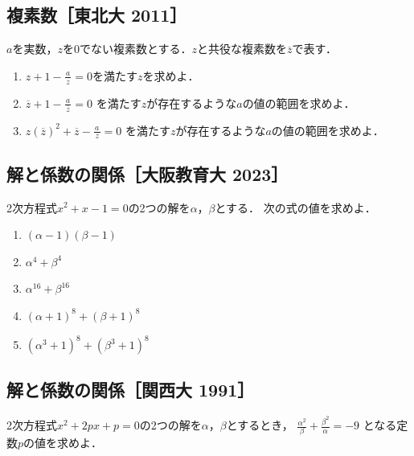 \documentclass[../all/math-standard_questions_all.tex]{subfiles}
\begin{document}
\subsection{複素数［東北大 2011］}

$a$を実数，$z$を0でない複素数とする．$z$と共役な複素数を$\overline{z}$で表す．

\begin{enumerate}

    \item $\displaystyle z+1-\frac{a}{\,z\,} = 0$を満たす$z$を求めよ．

    \item $\displaystyle \overline{z}+1-\frac{a}{\,\overline{z}\,} = 0$
        を満たす$z$が存在するような$a$の値の範囲を求めよ．

    \item $\displaystyle z(\overline{z})^2 + \overline{z} - \frac{a}{\,z\,} = 0$
        を満たす$z$が存在するような$a$の値の範囲を求めよ．

\end{enumerate}

\vspace{2cm}
\vfill

\subsection{解と係数の関係［大阪教育大 2023］}

2次方程式$x^2+x-1=0$の2つの解を$\alpha$，$\beta$とする．
次の式の値を求めよ．

\begin{enumerate}
    \item $(\alpha-1)(\beta-1)$
    \item $\alpha^4+\beta^4$
    \item $\alpha^{16}+\beta^{16}$
    \item $(\alpha+1)^8+(\beta+1)^8$
    \item $(\alpha^3+1)^8+(\beta^3+1)^8$
\end{enumerate}

\vspace{2cm}
\vfill

\subsection{解と係数の関係［関西大 1991］}

2次方程式$x^2+2px+p=0$の2つの解を$\alpha$，$\beta$とするとき，
$\displaystyle \frac{\alpha^2}{\beta}+ \frac{\beta^2}{\alpha}=-9$
となる定数$p$の値を求めよ．
\end{document}
